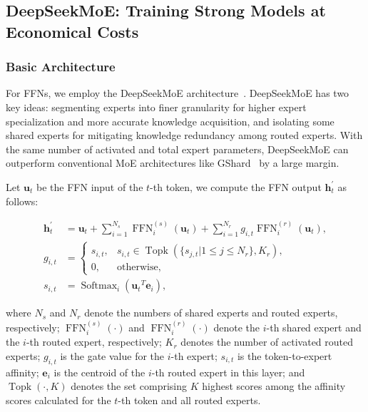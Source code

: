\subsection{DeepSeekMoE: Training Strong Models at Economical Costs}

\subsubsection{Basic Architecture}

For FFNs, we employ the DeepSeekMoE architecture~\citep{deepseekmoe}. DeepSeekMoE has two key ideas: segmenting experts into finer granularity for higher expert specialization and more accurate knowledge acquisition, and isolating some shared experts for mitigating knowledge redundancy among routed experts. With the same number of activated and total expert parameters, DeepSeekMoE can outperform conventional MoE architectures like GShard~\citep{gshard} by a large margin. 

Let $\mathbf{u}_{t}$ be the FFN input of the $t$-th token, we compute the FFN output $\mathbf{h}_{t}^{\prime}$ as follows:

\begin{align}
    \mathbf{h}_{t}^{\prime} & = \mathbf{u}_{t} + \sum_{i=1}^{N_{s}} {\operatorname{FFN}^{(s)}_{i}\left( \mathbf{u}_{t} \right)} + \sum_{i=1}^{N_r} {g_{i,t} \operatorname{FFN}^{(r)}_{i}\left( \mathbf{u}_{t} \right)}, \\
    g_{i,t} & = \begin{cases} 
    s_{i,t}, & s_{i,t} \in \operatorname{Topk} (\{ s_{j, t} | 1 \leqslant j \leqslant N_r \}, K_{r}), \\
    0, & \text{otherwise}, 
    \end{cases} \\
    s_{i,t} & = \operatorname{Softmax}_i \left( {\mathbf{u}_{t}}^{T} \mathbf{e}_{i} \right),
\end{align}

where $N_{s}$ and $N_r$ denote the numbers of shared experts and routed experts, respectively; 
$\operatorname{FFN}^{(s)}_{i}(\cdot)$ and $\operatorname{FFN}^{(r)}_{i}(\cdot)$ denote the $i$-th shared expert and the $i$-th routed expert, respectively; $K_{r}$ denotes the number of activated routed experts; $g_{i,t}$ is the gate value for the $i$-th expert; $s_{i,t}$ is the token-to-expert affinity; 
$\mathbf{e}_{i}$ is the centroid of the $i$-th routed expert in this layer; and $\operatorname{Topk}(\cdot, K)$ denotes the set comprising $K$ highest scores among the affinity scores calculated for the $t$-th token and all routed experts.

